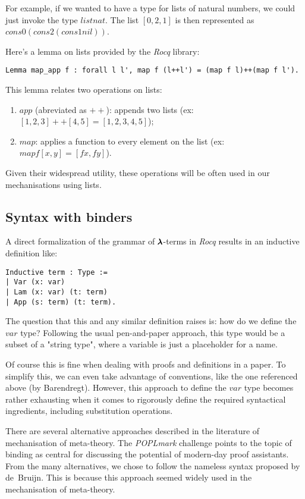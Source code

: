For example, if we wanted to have a type for lists of natural numbers, we could just invoke the type \lst$list nat$.
The list \lst$[0,2,1]$ is then represented as \lst$cons 0 (cons 2 (cons 1 nil))$.

Here's a lemma on lists provided by the \textit{Rocq} library:
\begin{lstlisting}[language=Coq]
Lemma map_app f : forall l l', map f (l++l') = (map f l)++(map f l').
\end{lstlisting}

This lemma relates two operations on lists:
\begin{enumerate}
\item \lst$app$ (abreviated as \lst$++$): appends two lists (ex: \lst$[1,2,3]++[4,5] = [1,2,3,4,5]$);
\item \lst$map$: applies a function to every element on the list (ex: \lst$map f [x,y] = [f x, f y]$).
\end{enumerate}
Given their widespread utility, these operations will be often used in our mechanisations using lists.

\subsection{Syntax with binders}

A direct formalization of the grammar of $\pmb{\lambda}$-terms in \textit{Rocq} results in an inductive definition like:
\begin{lstlisting}[language=Coq]
Inductive term : Type :=
| Var (x: var)
| Lam (x: var) (t: term)
| App (s: term) (t: term).
\end{lstlisting}

The question that this and any similar definition raises is: how do we define the \lst$var$ type? Following the usual pen-and-paper approach, this type would be a subset of a "string type", where a variable is just a placeholder for a name.

Of course this is fine when dealing with proofs and definitions in a paper.
To simplify this, we can even take advantage of conventions, like the one referenced above (by Barendregt).
However, this approach to define the \lst$var$ type becomes rather exhausting when it comes to rigorously define the required syntactical ingredients, including substitution operations.

There are several alternative approaches described in the literature of mechanisation of meta-theory. 
The \textit{POPLmark} challenge \cite{POPLmark} points to the topic of binding as central for discussing the potential of modern-day proof assistants.
From the many alternatives, we chose to follow the nameless syntax proposed by de~Bruijn.
This is because this approach seemed widely used in the mechanisation of meta-theory.

